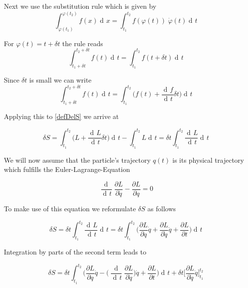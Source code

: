 \documentclass{article}
\DeclareMathOperator{\dd}{d\!}
\begin{document}
Next we use the substitution rule which is given by
\begin{equation}
\int_{\varphi(t_1)}^{\varphi(t_2)} f(x) \dd x = \int_{t_1}^{t_2} f(\varphi(t)) \; \dot{\varphi}(t) \dd t
\end{equation}

For $\varphi (t) = t + \delta t$ the rule reads
\begin{equation}
\int_{t_1 + \delta t}^{t_2 + \delta t} f(t) \dd t = \int_{t_1}^{t_2} f(t + \delta t) \dd t
\end{equation}

Since $\delta t$ is small we can write
\begin{equation}
\int_{t_1 + \delta t}^{t_2 + \delta t} f(t) \dd t 
= \int_{t_1}^{t_2} \bigg(f(t) + \frac{\dd f}{\dd t} \delta t \bigg) \dd t
\end{equation} 

Applying this to \ref{defDelS} we arrive at

\begin{equation}
\delta S = \int_{t_1}^{t_2} \bigg(L + \frac{\dd L}{\dd t} \delta t \bigg) \dd t - \int_{t_1}^{t_2} L \dd t
= \delta t \int_{t_1}^{t_2} \frac{\dd L}{\dd t} \dd t
\end{equation}

We will now assume that the particle's trajectory $q(t)$ is its physical trajectory which fulfills the Euler-Lagrange-Equation

\begin{equation} \label{ParticleEulLagEqu}
\frac{\dd}{\dd t} \frac{\partial L}{\partial \dot{q}} - \frac{\partial L}{\partial q} = 0
\end{equation}

To make use of this equation we reformulate $\delta S$ as follows

\begin{equation}
\delta S = \delta t \int_{t_1}^{t_2} \frac{\dd L}{\dd t} \dd t
= \delta t \int_{t_1}^{t_2} \bigg(
\frac{\partial L}{\partial q} \dot{q} + \frac{\partial L}{\partial \dot{q}} \ddot{q} + \frac{\partial L}{\partial t} 
\bigg) \dd t
\end{equation}

Integration by parts of the second term leads to

\begin{equation}
\delta S = \delta t \int_{t_1}^{t_2} \bigg(
\frac{\partial L}{\partial q} \dot{q} -\bigg( \frac{\dd }{\dd t}\frac{\partial L}{\partial \dot{q}} \bigg) \dot{q} 
 + \frac{\partial L}{\partial t}
\bigg) \dd t
+ \delta t \bigg[ \frac{\partial L}{\partial \dot{q}} \dot{q} \bigg]_{t_1}^{t_2}
\end{equation}
\end{document}
